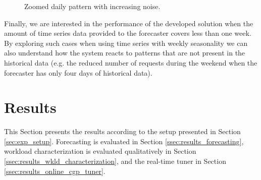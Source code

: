 \documentclass[a4paper, 12pt]{article} %
\begin{document}
	\begin{figure}\centering
		 \hfill
		
		\caption{Zoomed daily pattern with increasing noise.}
		\label{fig:daily_noises}
	\end{figure}
	
	Finally, we are interested in the performance of the developed solution when the amount of time series data provided to the forecaster covers less than one week. By exploring such cases when using time series with weekly seasonality we can also understand how the system reacts to patterns that are not present in the historical data (e.g. the reduced number of requests during the weekend when the forecaster has only four days of historical data).
	
	
	\section{Results } \label{sec:results}
	This Section presents the results according to the setup presented in Section \ref{sec:exp_setup}. Forecasting is evaluated in Section \ref{ssec:results_forecasting}, workload characterization is evaluated qualitatively in Section \ref{ssec:results_wkld_characterization}, and the real-time tuner in Section \ref{ssec:results_online_cgp_tuner}. 
	
\end{document}
